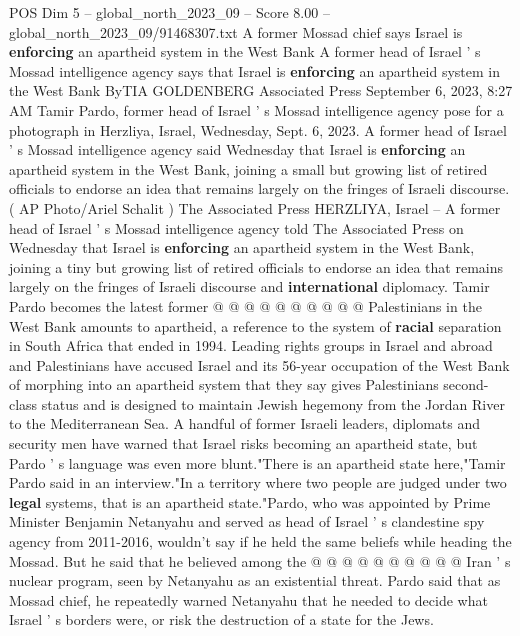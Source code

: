\begin{textsample}{POS Dim 5 – global\_north\_2023\_09 – Score 8.00 – global\_north\_2023\_09/91468307.txt}  \label{ex:f5_pos_432}
A former Mossad chief says Israel is \textbf{enforcing} an apartheid system in the West Bank A former head of Israel ' s Mossad intelligence agency says that Israel is \textbf{enforcing} an apartheid system in the West Bank ByTIA GOLDENBERG Associated Press September 6, 2023, 8:27 AM Tamir Pardo, former head of Israel ' s Mossad intelligence agency pose for a photograph in Herzliya, Israel, Wednesday, Sept. 6, 2023.
A former head of Israel ' s Mossad intelligence agency said Wednesday that Israel is \textbf{enforcing} an apartheid system in the West Bank, joining a small but growing list of retired officials to endorse an idea that remains largely on the fringes of Israeli discourse. ( AP Photo/Ariel Schalit ) The Associated Press HERZLIYA, Israel -- A former head of Israel ' s Mossad intelligence agency told The Associated Press on Wednesday that Israel is \textbf{enforcing} an apartheid system in the West Bank, joining a tiny but growing list of retired officials to endorse an idea that remains largely on the fringes of Israeli discourse and \textbf{international} diplomacy.
Tamir Pardo becomes the latest former @ @ @ @ @ @ @ @ @ @ Palestinians in the West Bank amounts to apartheid, a reference to the system of \textbf{racial} separation in South Africa that ended in 1994.
Leading rights groups in Israel and abroad and Palestinians have accused Israel and its 56-year occupation of the West Bank of morphing into an apartheid system that they say gives Palestinians second-class status and is designed to maintain Jewish hegemony from the Jordan River to the Mediterranean Sea.
A handful of former Israeli leaders, diplomats and security men have warned that Israel risks becoming an apartheid state, but Pardo ' s language was even more blunt."There is an apartheid state here,"Tamir Pardo said in an interview."In a territory where two people are judged under two \textbf{legal} systems, that is an apartheid state."Pardo, who was appointed by Prime Minister Benjamin Netanyahu and served as head of Israel ' s clandestine spy agency from 2011-2016, wouldn't say if he held the same beliefs while heading the Mossad.
But he said that he believed among the @ @ @ @ @ @ @ @ @ @ Iran ' s nuclear program, seen by Netanyahu as an existential threat.
Pardo said that as Mossad chief, he repeatedly warned Netanyahu that he needed to decide what Israel ' s borders were, or risk the destruction of a state for the Jews.

\end{textsample}

